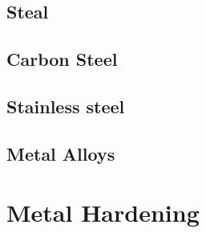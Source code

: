 \subsection{Steal}
\subsection{Carbon Steel}
\subsection{Stainless steel}
\subsection{Metal Alloys}

\newpage
\section{Metal Hardening}

